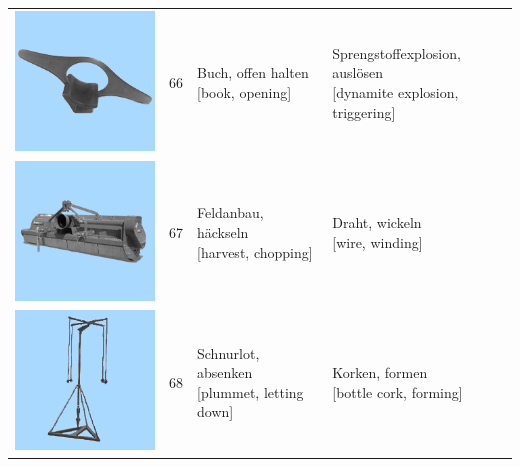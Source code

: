\documentclass[
  english,
  doc,12pt,twoside,floatsintext]{apa7}
\begin{document}
\begin{center}
\begin{ThreePartTable}
{\begin{longtable}{llll}
\includegraphics[valign=c, scale=0.23]{../materials/unfamiliar/66.png} & 66 & \makecell[l]{Buch, offen halten\\{[book, opening]}} & \makecell[l]{Sprengstoffexplosion, auslösen\\{[dynamite explosion, triggering]}}\\
\includegraphics[valign=c, scale=0.23]{../materials/unfamiliar/67.png} & 67 & \makecell[l]{Feldanbau, häckseln\\{[harvest, chopping]}} & \makecell[l]{Draht, wickeln\\{[wire, winding]}}\\
\includegraphics[valign=c, scale=0.23]{../materials/unfamiliar/68.png} & 68 & \makecell[l]{Schnurlot, absenken\\{[plummet, letting down]}} & \makecell[l]{Korken, formen\\{[bottle cork, forming]}}\\

\end{longtable}}
\end{ThreePartTable}
\end{center}
\end{document}
